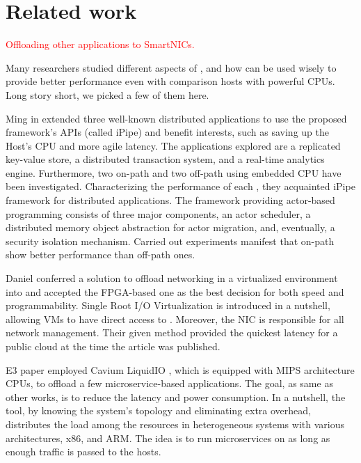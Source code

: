 \section{Related work}
\label{sec-related}

\textcolor{red}{Offloading other applications to SmartNICs.}

Many researchers studied different aspects of \smartnics, and how \smartnics can be used wisely to provide better performance even with comparison hosts with powerful CPUs. Long story short, we picked a few of them here.
\par
Ming \etal in \cite{10.1145/3341302.3342079} extended three well-known distributed applications to use the proposed framework's APIs (called iPipe) and benefit \smartnics interests, such as saving up the Host's CPU and more agile latency. The applications explored are a replicated key-value store, a distributed transaction system, and a real-time analytics engine. Furthermore, two on-path and two off-path \smartnics using embedded CPU have been investigated. Characterizing the performance of each \smartnics, they acquainted iPipe framework for distributed applications. The framework providing actor-based programming consists of three major components, an actor scheduler, a distributed memory object abstraction for actor migration, and, eventually, a security isolation mechanism. Carried out experiments manifest that on-path \smartnics show better performance than off-path ones.
\par
Daniel \etal \cite{211249} conferred a solution to offload networking in a virtualized environment into \smartnics and accepted the FPGA-based one as the best decision for both speed and programmability. Single Root I/O Virtualization is introduced in a nutshell, allowing VMs to have direct access to \smartnics. Moreover, the NIC is responsible for all network management. Their given method provided the quickest latency for a public cloud at the time the article was published. 
\par
E3 paper \cite{234944} employed Cavium LiquidIO \smartnics, which is equipped with MIPS architecture CPUs, to offload a few microservice-based applications. The goal, as same as other works, is to reduce the latency and power consumption. In a nutshell, the tool, by knowing the system's topology and eliminating extra overhead, distributes the load among the resources in heterogeneous systems with various architectures, x86, and ARM. The idea is to run microservices on \smartnics as long as enough traffic is passed to the hosts.
